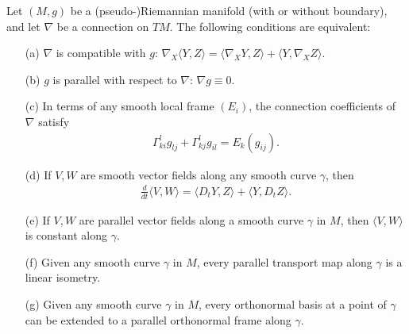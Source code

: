 \begin{proposition}\label{metric connections char}
Let $(M,g)$ be a (pseudo-)Riemannian manifold (with or without boundary), and let $\nabla$ be a connection on $TM$. The following conditions are equivalent:
\begin{itemize}
\item[(a)] $\nabla$ is compatible with $g$: $\nabla_X\langle Y,Z\rangle=\langle\nabla_XY,Z\rangle+\langle Y,\nabla_XZ\rangle$.
\item[(b)] $g$ is parallel with respect to $\nabla$: $\nabla g\equiv 0$.
\item[(c)] In terms of any smooth local frame $(E_i)$, the connection coefficients of $\nabla$ satisfy
\begin{align}\label{metric connections char-1}
\Gamma_{ki}^lg_{lj}+\Gamma_{kj}^lg_{il}=E_k(g_{ij}).
\end{align} 
\item[(d)] If $V,W$ are smooth vector fields along any smooth curve $\gamma$, then
\begin{align}\label{metric connections char-2}
\frac{d}{dt}\langle V,W\rangle=\langle D_tY,Z\rangle+\langle Y,D_tZ\rangle.
\end{align} 
\item[(e)] If $V,W$ are parallel vector fields along a smooth curve $\gamma$ in $M$, then $\langle V,W\rangle$ is constant along $\gamma$. 
\item[(f)] Given any smooth curve $\gamma$ in $M$, every parallel transport map along $\gamma$ is a linear isometry.
\item[(g)] Given any smooth curve $\gamma$ in $M$, every orthonormal basis at a point of $\gamma$ can be extended to a parallel orthonormal frame along $\gamma$.
\end{itemize}
\end{proposition}

